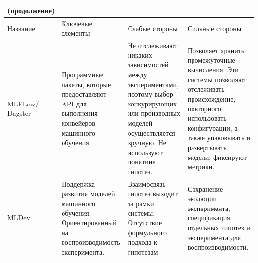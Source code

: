 \begin{table} [ht]%
	\caption*{}%
    \setlength\extrarowheight{0pt} %
    \setlength{\tymin}{2.3cm}%
	\begin{tabulary}{\textwidth}{@{}>{\zz}L >{\zz}L >{\zz}L >{\zz}L@{}}%
        \toprule     %
         \scriptsize (продолжение) & & & 
        \\
        \midrule
    	Название &
    	Ключевые элементы &
    	Слабые стороны &
    	Сильные стороны	\\
        \midrule %

        MLFLow/ Dagster &
        Программные пакеты, которые предоставляют API для выполнения конвейеров машинного обучения 
        &
        Не отслеживают никаких зависимостей между экспериментами, поэтому выбор конкурирующих или производных моделей осуществляется вручную. Не используют понятине гипотез.
        &
        Позволяет хранить промежуточные вычисления. Эти системы позволяют отслеживать происхождение, повторного использовать конфигурации, а также упаковывать и развертывать модели, фиксируют метрики.
        \\
        \midrule
        MLDev &
        Поддержка развития моделей машинного обучения. Ориентированный на воспроизводимость эксперимента. &
        Взаимосвязь гипотез выходит за рамки системы. Отсутствие формульного подхода к гипотезам &
        Сохранение эколюции эксперимента, спецификация отдельных гипотез и эксперимента для воспроизводимости.
        \\
        \bottomrule %
	\end{tabulary}%
\end{table}


